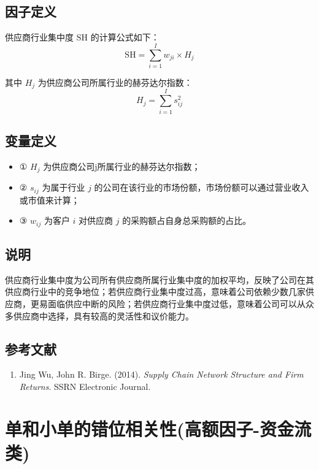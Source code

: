 \documentclass{article}
\begin{document}
\subsection{因子定义}


供应商行业集中度 \(\mathrm{SH}\) 的计算公式如下：
\begin{equation}
    \mathrm{SH} = \sum_{i=1}^{I} w_{ji} \times H_j
\end{equation}

其中 \(H_j\) 为供应商公司所属行业的赫芬达尔指数：
\begin{equation}
    H_j = \sum_{i=1}^{I} s_{ij}^2
\end{equation}

\subsection{变量定义}
\begin{itemize}
    \item ① \(H_j\) 为供应商公司j所属行业的赫芬达尔指数；
    \item ② \(s_{ij}\) 为属于行业 \(j\) 的公司在该行业的市场份额，市场份额可以通过营业收入或市值来计算；
    \item ③ \(w_{ij}\) 为客户 \(i\) 对供应商 \(j\) 的采购额占自身总采购额的占比。
\end{itemize}

\subsection{说明}
供应商行业集中度为公司所有供应商所属行业集中度的加权平均，反映了公司在其供应商行业中的竞争地位；若供应商行业集中度过高，意味着公司依赖少数几家供应商，更易面临供应中断的风险；若供应商行业集中度过低，意味着公司可以从众多供应商中选择，具有较高的灵活性和议价能力。

\subsection{参考文献}
\begin{enumerate}
    \item Jing Wu, John R. Birge. (2014). \textit{Supply Chain Network Structure and Firm Returns}. SSRN Electronic Journal.
\end{enumerate}

\section{单和小单的错位相关性(高额因子-资金流类)}
\end{document}
